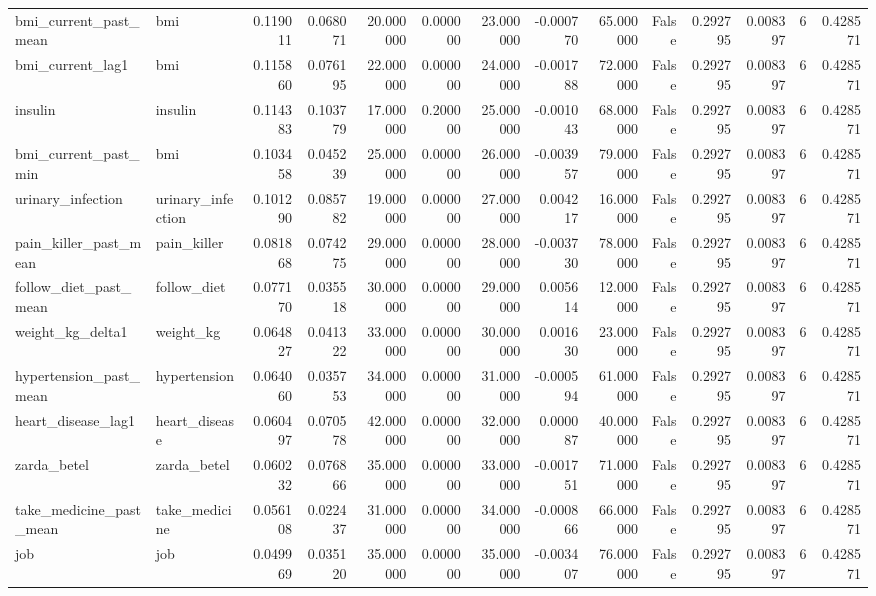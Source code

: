 \begin{longtable}{llrrrrrrrrrrrr}
bmi\_current\_past\_mean & bmi & 0.119011 & 0.068071 & 20.000000 & 0.000000 & 23.000000 & -0.000770 & 65.000000 & False & 0.292795 & 0.008397 & 6 & 0.428571 \\
bmi\_current\_lag1 & bmi & 0.115860 & 0.076195 & 22.000000 & 0.000000 & 24.000000 & -0.001788 & 72.000000 & False & 0.292795 & 0.008397 & 6 & 0.428571 \\
insulin & insulin & 0.114383 & 0.103779 & 17.000000 & 0.200000 & 25.000000 & -0.001043 & 68.000000 & False & 0.292795 & 0.008397 & 6 & 0.428571 \\
bmi\_current\_past\_min & bmi & 0.103458 & 0.045239 & 25.000000 & 0.000000 & 26.000000 & -0.003957 & 79.000000 & False & 0.292795 & 0.008397 & 6 & 0.428571 \\
urinary\_infection & urinary\_infection & 0.101290 & 0.085782 & 19.000000 & 0.000000 & 27.000000 & 0.004217 & 16.000000 & False & 0.292795 & 0.008397 & 6 & 0.428571 \\
pain\_killer\_past\_mean & pain\_killer & 0.081868 & 0.074275 & 29.000000 & 0.000000 & 28.000000 & -0.003730 & 78.000000 & False & 0.292795 & 0.008397 & 6 & 0.428571 \\
follow\_diet\_past\_mean & follow\_diet & 0.077170 & 0.035518 & 30.000000 & 0.000000 & 29.000000 & 0.005614 & 12.000000 & False & 0.292795 & 0.008397 & 6 & 0.428571 \\
weight\_kg\_delta1 & weight\_kg & 0.064827 & 0.041322 & 33.000000 & 0.000000 & 30.000000 & 0.001630 & 23.000000 & False & 0.292795 & 0.008397 & 6 & 0.428571 \\
hypertension\_past\_mean & hypertension & 0.064060 & 0.035753 & 34.000000 & 0.000000 & 31.000000 & -0.000594 & 61.000000 & False & 0.292795 & 0.008397 & 6 & 0.428571 \\
heart\_disease\_lag1 & heart\_disease & 0.060497 & 0.070578 & 42.000000 & 0.000000 & 32.000000 & 0.000087 & 40.000000 & False & 0.292795 & 0.008397 & 6 & 0.428571 \\
zarda\_betel & zarda\_betel & 0.060232 & 0.076866 & 35.000000 & 0.000000 & 33.000000 & -0.001751 & 71.000000 & False & 0.292795 & 0.008397 & 6 & 0.428571 \\
take\_medicine\_past\_mean & take\_medicine & 0.056108 & 0.022437 & 31.000000 & 0.000000 & 34.000000 & -0.000866 & 66.000000 & False & 0.292795 & 0.008397 & 6 & 0.428571 \\
job & job & 0.049969 & 0.035120 & 35.000000 & 0.000000 & 35.000000 & -0.003407 & 76.000000 & False & 0.292795 & 0.008397 & 6 & 0.428571 \\

\end{longtable}
